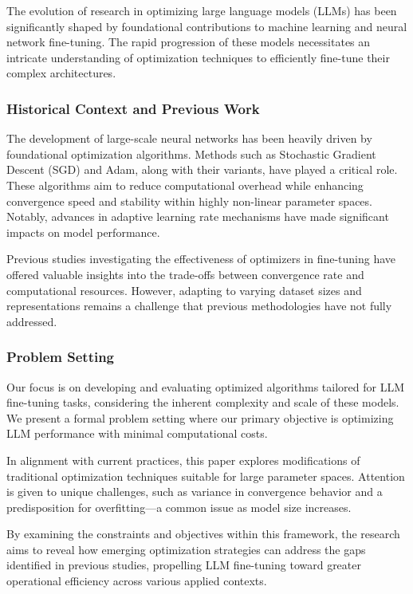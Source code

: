\documentclass{article} %
\begin{document}
The evolution of research in optimizing large language models (LLMs) has been significantly shaped by foundational contributions to machine learning and neural network fine-tuning. The rapid progression of these models necessitates an intricate understanding of optimization techniques to efficiently fine-tune their complex architectures.

\subsubsection{Historical Context and Previous Work}

The development of large-scale neural networks has been heavily driven by foundational optimization algorithms. Methods such as Stochastic Gradient Descent (SGD) and Adam, along with their variants, have played a critical role. These algorithms aim to reduce computational overhead while enhancing convergence speed and stability within highly non-linear parameter spaces. Notably, advances in adaptive learning rate mechanisms have made significant impacts on model performance.

Previous studies investigating the effectiveness of optimizers in fine-tuning have offered valuable insights into the trade-offs between convergence rate and computational resources. However, adapting to varying dataset sizes and representations remains a challenge that previous methodologies have not fully addressed.

\subsubsection{Problem Setting}

Our focus is on developing and evaluating optimized algorithms tailored for LLM fine-tuning tasks, considering the inherent complexity and scale of these models. We present a formal problem setting where our primary objective is optimizing LLM performance with minimal computational costs.

In alignment with current practices, this paper explores modifications of traditional optimization techniques suitable for large parameter spaces. Attention is given to unique challenges, such as variance in convergence behavior and a predisposition for overfitting—a common issue as model size increases.

By examining the constraints and objectives within this framework, the research aims to reveal how emerging optimization strategies can address the gaps identified in previous studies, propelling LLM fine-tuning toward greater operational efficiency across various applied contexts.
\end{document}
